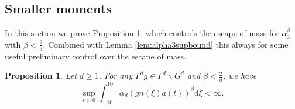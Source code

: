 \documentclass[12pt]{amsart}
\newtheorem{prop}[thm]{Proposition}
\theoremstyle{definition}
\theoremstyle{remark}
\numberwithin{equation}{section}
\newcommand{\dd}{\mathrm{d}}
\begin{document}
\subsection{Smaller moments}
\label{sec:smallmoments}

In this section we prove Proposition \ref{prop:smallmoment}, which controls the escape of mass for $\alpha_3^\beta$ with $\beta < \tfrac{2}{3}$.
Combined with Lemma \ref{lem:alpha3supbound} this always for some useful preliminary control over the escape of mass.
\begin{prop}
  \label{prop:smallmoment}
  Let $d\geq 1$. For any $\Gamma^dg \in \Gamma^d \backslash G^d$ and $\beta < \tfrac{2}{d}$, we have
  \begin{equation}
    \label{eq:smallmoment}
    \sup_{t > 0} \int_{-10}^{10} \alpha_d(gn(\xi) a(t))^\beta \dd \xi < \infty.
  \end{equation}
\end{prop}
\end{document}
